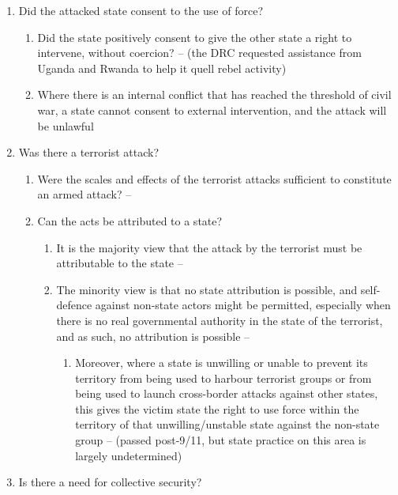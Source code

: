 \begin{enumerate}
    \item Did the attacked state consent to the use of force?
    \begin{enumerate}
        \item Did the state positively consent to give the other state a right to intervene, without coercion? --  (the DRC requested assistance from Uganda and Rwanda to help it quell rebel activity)
        \item Where there is an internal conflict that has reached the threshold of civil war, a state cannot consent to external intervention, and the attack will be unlawful
    \end{enumerate}
    \item Was there a terrorist attack?
    \begin{enumerate}
        \item Were the scales and effects of the terrorist attacks sufficient to constitute an armed attack? -- 
        \item Can the acts be attributed to a state?
        \begin{enumerate}
            \item It is the majority view that the attack by the terrorist must be attributable to the state -- 
            \item The minority view is that no state attribution is possible, and self-defence against non-state actors might be permitted, especially when there is no real governmental authority in the state of the terrorist, and as such, no attribution is possible -- 
            \begin{enumerate}
                \item Moreover, where a state is unwilling or unable to prevent its territory from being used to harbour terrorist groups or from being used to launch cross-border attacks against other states, this gives the victim state the right to use force within the territory of that unwilling/unstable state against the non-state group --  (passed post-9/11, but state practice on this area is largely undetermined) 
            \end{enumerate}
        \end{enumerate}
    \end{enumerate}
    \item Is there a need for collective security?

\end{enumerate}
